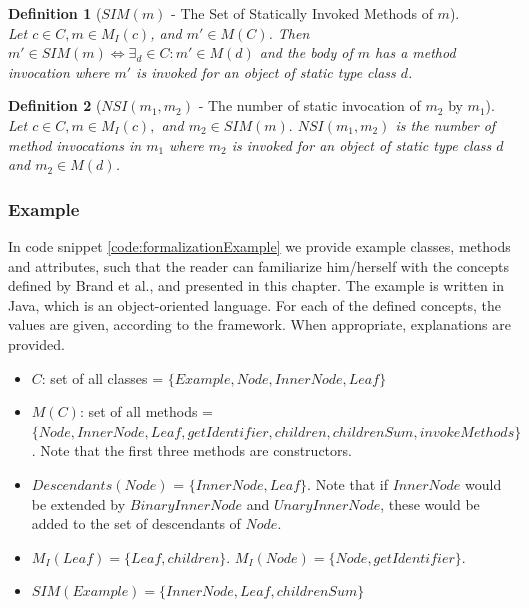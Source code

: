 \documentclass{uvamscse}
\newtheorem{definition}{Definition}[section]
\newcommand{\Aframework}{Brand et al.}
\begin{document}
\begin{definition}[$SIM(m)$ - The Set of Statically Invoked Methods of $m$] \hspace{1em} \\
	Let $c \in C, m \in M_I(c)$, and $m' \in M(C)$. Then $m' \in SIM(m) \Leftrightarrow \exists_d \in C : m' \in M(d)$ and the body of $m$ has a method invocation where $m'$ is invoked for an object of static type class $d$.
\end{definition}



\begin{definition}[$NSI(m_1, m_2)$ - The number of static invocation of $m_2$ by $m_1$] \hspace{1em} \\
	Let $c \in C, m \in M_I(c),$ and $m_2 \in SIM(m).$ $NSI(m_1, m_2)$ is the number of method invocations in $m_1$ where $m_2$ is invoked for an object of static type class $d$ and $m_2 \in M(d)$.
\end{definition}

\subsubsection{Example}
In code snippet \ref{code:formalizationExample} we provide example classes, methods and attributes, such that the reader can familiarize him/herself with the concepts defined by \Aframework, and presented in this chapter. The example is written in Java, which is an object-oriented language. For each of the defined concepts, the values are given, according to the framework. When appropriate, explanations are provided.

\begin{itemize}
	\item $C$: set of all classes = $\{Example, Node, InnerNode, Leaf\}$
	\item $M(C)$: set of all methods = $\{Node, InnerNode, Leaf, getIdentifier, children, childrenSum, invokeMethods\}$. Note that the first three methods are constructors.
	\item  $Descendants(Node)$ = $\{InnerNode, Leaf\}$. Note that if $InnerNode$ would be extended by $BinaryInnerNode$ and $UnaryInnerNode$, these would be added to the set of descendants of $Node$.
	\item $M_I(Leaf) = \{Leaf, children\}$. $M_I(Node) = \{Node, getIdentifier\}$.
	\item $SIM(Example) = \{InnerNode, Leaf, childrenSum\}$ 
	
\end{itemize}
\clearpage

\clearpage
\end{document}
